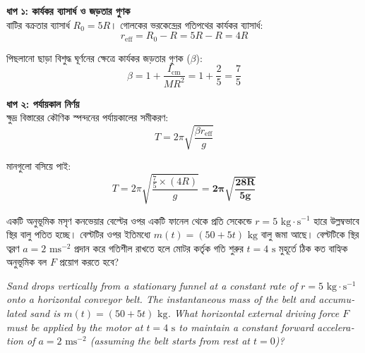 \documentclass[12pt, a4paper]{article}
\begin{document}
\begin{tcolorbox}[solutionbox={সমাধান (Solution)}]
    \noindent
    \textbf{ধাপ ১: কার্যকর ব্যাসার্ধ ও জড়তার গুণক} \\
    বাটির বক্রতার ব্যাসার্ধ $R_0 = 5R$। গোলকের ভরকেন্দ্রের গতিপথের কার্যকর ব্যাসার্ধ:
    \[ r_{\text{eff}} = R_0 - R = 5R - R = 4R \]
    
    পিছলানো ছাড়া বিশুদ্ধ ঘূর্ণনের ক্ষেত্রে কার্যকর জড়তার গুণক ($\beta$):
    \[ \beta = 1 + \frac{I_{\text{cm}}}{M R^2} = 1 + \frac{2}{5} = \frac{7}{5} \]
    
    \vspace{0.5em}
    \noindent\textbf{ধাপ ২: পর্যায়কাল নির্ণয়} \\
    ক্ষুদ্র বিস্তারের কৌণিক স্পন্দনের পর্যায়কালের সমীকরণ:
    \[ T = 2\pi \sqrt{\frac{\beta r_{\text{eff}}}{g}} \]
    
    মানগুলো বসিয়ে পাই:
    \[ T = 2\pi \sqrt{\frac{\frac{7}{5} \times (4R)}{g}} = \mathbf{2\pi \sqrt{\frac{28 R}{5 g}}} \]
\end{tcolorbox}

\newpage

\begin{tcolorbox}[questionbox={প্রশ্ন (Question) 38}]
    \noindent
    একটি অনুভূমিক মসৃণ কনভেয়ার বেল্টের ওপর একটি ফানেল থেকে প্রতি সেকেন্ডে $r = 5\text{ kg}\cdot\text{s}^{-1}$ হারে উল্লম্বভাবে স্থির বালু পতিত হচ্ছে। বেল্টটির ওপর ইতিমধ্যে $m(t) = (50 + 5t)\text{ kg}$ বালু জমা আছে। বেল্টটিকে স্থির ত্বরণ $a = 2\text{ ms}^{-2}$ প্রদান করে গতিশীল রাখতে হলে মোটর কর্তৃক গতি শুরুর $t = 4\text{ s}$ মুহূর্তে ঠিক কত বাহ্যিক অনুভূমিক বল $F$ প্রয়োগ করতে হবে?
    
    \vspace{0.8em}
    \begin{english}
    \noindent\textit{\color{darkgray}
    Sand drops vertically from a stationary funnel at a constant rate of $r = 5\text{ kg}\cdot\text{s}^{-1}$ onto a horizontal conveyor belt. The instantaneous mass of the belt and accumulated sand is $m(t) = (50 + 5t)\text{ kg}$. What horizontal external driving force $F$ must be applied by the motor at $t = 4\text{ s}$ to maintain a constant forward acceleration of $a = 2\text{ ms}^{-2}$ (assuming the belt starts from rest at $t = 0$)?
    }
    \end{english}
\end{tcolorbox}
\end{document}
